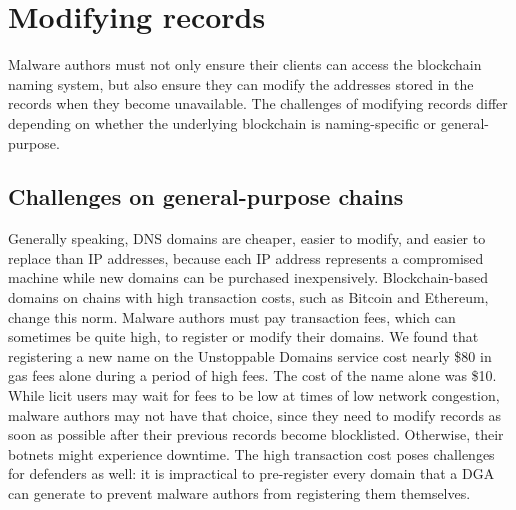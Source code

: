 \section{Modifying records}
\label{sec:modifying_records}

Malware authors must not only ensure their clients can access the blockchain 
naming system, but 
also ensure they can modify the addresses stored in the records when they 
become unavailable. The challenges of modifying records 
differ depending on whether the underlying blockchain is 
naming-specific or general-purpose.

\subsection{Challenges on general-purpose chains}

Generally speaking, DNS domains are cheaper, easier to modify, and 
easier to replace than IP 
addresses, because each IP address represents a compromised machine while 
new domains can be 
purchased inexpensively. Blockchain-based domains on chains with high 
transaction costs, such as 
Bitcoin and Ethereum, change this norm. Malware authors must pay 
transaction fees, which can 
sometimes be quite high, to register or modify their domains. We found that 
registering a new name 
on the Unstoppable Domains service cost nearly \$80 in gas fees alone during a 
period of high fees. 
The cost of the name alone was \$10. While licit users may wait for fees to be 
low at times of low 
network congestion, malware authors may not have that choice, since they 
need to modify records as 
soon as possible after their previous records become blocklisted. Otherwise, 
their botnets might 
experience downtime. The high transaction cost poses challenges for 
defenders as well: it is 
impractical to pre-register every domain that a DGA can generate to prevent 
malware authors from 
registering them themselves. 



